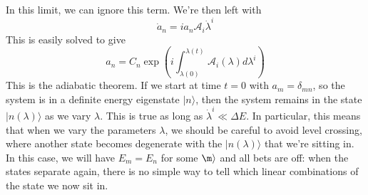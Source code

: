 \documentclass[cyan]{elegantnote}
\begin{document}
In this limit, we can ignore this term. We're then left with
\[\dot{a}_n = ia_n\mathcal{A}_i \dot{\lambda}^i\]
This is easily solved to give
\[a_n = C_n \exp \left(i \int_{\lambda(0)}^{\lambda(t)}  \mathcal{A}_i(\lambda) d\lambda^i \right)\]
This is the adiabatic theorem. If we start at time $t = 0$ with $a_m = \delta_{mn}$, so the system is in a definite energy eigenstate $|n\rangle$, then the system remains in the state $|n(\lambda)\rangle$ as we vary $\lambda$. 
This is true as long as $\dot{\lambda}^i \ll \Delta E$.
In particular, this means that when we vary the parameters $\lambda$, we should be careful to avoid level crossing, where another state becomes degenerate with the $|n(\lambda)\rangle$ that we're sitting in. 
In this case, we will have $E_m = E_n$ for some $\m\rangle$ and all bets are off: when the states separate again, there is no simple way to tell which linear combinations of the state we now sit in.
\end{document}
